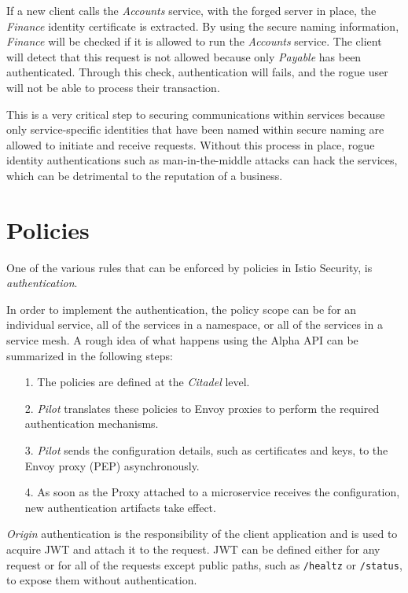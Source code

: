 If a new client calls the \textit{Accounts} service, with the forged server in place, the \textit{Finance} identity certificate is extracted. By using the secure naming information, \textit{Finance} will be checked if it is allowed to run the \textit{Accounts} service. The client will detect that this request is not allowed because only \textit{Payable} has been authenticated. Through this check, authentication will fails, and the rogue user will not be able to process their transaction.

This is a very critical step to securing communications within services because only service-specific identities that have been named within secure naming are allowed to initiate and receive requests. Without this process in place, rogue identity authentications such as man-in-the-middle attacks can hack the services, which can be detrimental to the reputation of a business.

\section{Policies}
One of the various rules that can be enforced by policies in Istio Security, is \textit{authentication}. 

In order to implement the authentication, the policy scope can be for an individual service, all of the services in a namespace, or all of the services in a service mesh. A rough idea of what happens using the Alpha API can be summarized in the following steps:

\begin{itemize}
    \item[1.] The policies are defined at the \textit{Citadel} level.
    \item[2.] \textit{Pilot} translates these policies to Envoy proxies to perform the required authentication mechanisms.
    \item[3.] \textit{Pilot} sends the configuration details, such as certificates and keys, to the Envoy proxy (PEP) asynchronously.
    \item[4.] As soon as the Proxy attached to a microservice receives the configuration, new authentication artifacts take effect. 
\end{itemize}

\textit{Origin} authentication is the responsibility of the client application and is used to acquire JWT and attach it to the request. JWT can be defined either for any request or for all of the requests except public paths, such as \texttt{/healtz} or \texttt{/status}, to expose them without authentication.

